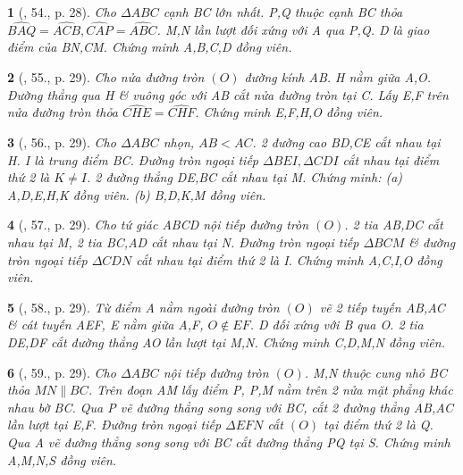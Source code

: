 \documentclass{article}
\newtheorem{baitoan}{}
\begin{document}
\begin{baitoan}[\cite{Thu_Chung_Viet_Minh_circ}, 54., p. 28]
	Cho $\Delta ABC$ cạnh BC lớn nhất. P,Q thuộc cạnh BC thỏa $\widehat{BAQ} = \widehat{ACB},\widehat{CAP} = \widehat{ABC}$. M,N lần lượt đối xứng với A qua P,Q. D là giao điểm của BN,CM. Chứng minh A,B,C,D đồng viên.
\end{baitoan}

\begin{baitoan}[\cite{Thu_Chung_Viet_Minh_circ}, 55., p. 29]
	Cho nửa đường tròn $(O)$ đường kính AB. H nằm giữa A,O. Đường thẳng qua H \& vuông góc với AB cắt nửa đường tròn tại C. Lấy E,F trên nửa đường tròn thỏa $\widehat{CHE} = \widehat{CHF}$. Chứng minh E,F,H,O đồng viên.
\end{baitoan}

\begin{baitoan}[\cite{Thu_Chung_Viet_Minh_circ}, 56., p. 29]
	Cho $\Delta ABC$ nhọn, $AB < AC$. 2 đường cao BD,CE cắt nhau tại H. I là trung điểm BC. Đường tròn ngoại tiếp $\Delta BEI,\Delta CDI$ cắt nhau tại điểm thứ 2 là $K\ne I$. 2 đường thẳng DE,BC cắt nhau tại M. Chứng minh: (a) A,D,E,H,K đồng viên. (b) B,D,K,M đồng viên.
\end{baitoan}

\begin{baitoan}[\cite{Thu_Chung_Viet_Minh_circ}, 57., p. 29]
	Cho tứ giác ABCD nội tiếp đường tròn $(O)$. 2 tia AB,DC cắt nhau tại M, 2 tia BC,AD cắt nhau tại N. Đường tròn ngoại tiếp $\Delta BCM$ \& đường tròn ngoại tiếp $\Delta CDN$ cắt nhau tại điểm thứ 2 là I. Chứng minh A,C,I,O đồng viên.
\end{baitoan}

\begin{baitoan}[\cite{Thu_Chung_Viet_Minh_circ}, 58., p. 29]
	Từ điểm A nằm ngoài đường tròn $(O)$ vẽ 2 tiếp tuyến AB,AC \& cát tuyến AEF, E nằm giữa A,F, $O\notin EF$. D đối xứng với B qua O. 2 tia DE,DF cắt đường thẳng AO lần lượt tại M,N. Chứng minh C,D,M,N đồng viên.
\end{baitoan}

\begin{baitoan}[\cite{Thu_Chung_Viet_Minh_circ}, 59., p. 29]
	Cho $\Delta ABC$ nội tiếp đường tròn $(O)$. M,N thuộc cung nhỏ BC thỏa $MN\parallel BC$. Trên đoạn AM lấy điểm P, P,M nằm trên 2 nửa mặt phẳng khác nhau bờ BC. Qua P vẽ đường thẳng song song với BC, cắt 2 đường thẳng AB,AC lần lượt tại E,F. Đường tròn ngoại tiếp $\Delta EFN$ cắt $(O)$ tại điểm thứ 2 là Q. Qua A vẽ đường thẳng song song với BC cắt đường thẳng PQ tại S. Chứng minh A,M,N,S đồng viên.
\end{baitoan}
\end{document}
